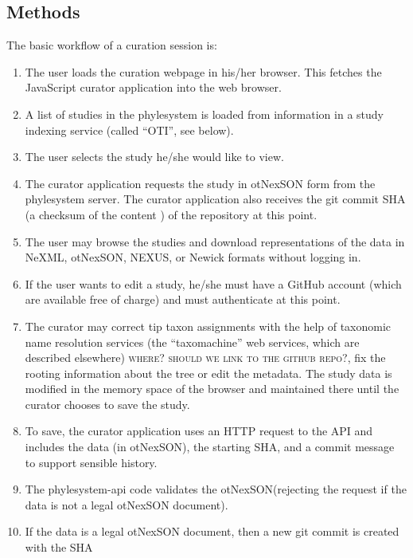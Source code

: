 \documentclass{bioinfo}
\newcommand{\ps}{phylesystem\xspace}
\newcommand{\nexson}{otNexSON\xspace}
\newcommand{\js}{JavaScript\xspace}
\newcommand{\ejmcomment}[1]{{\color{green} \textsc{#1}}\xspace}
\begin{document}
\begin{methods}
\section{Methods}
The basic workflow of a curation session is:
\begin{enumerate}
    \item \label{loadAppStep} The user loads the curation webpage in his/her browser.  This fetches the \js curator application into the web browser.
    \item \label{otiListStep} A list of studies in the \ps is loaded from information in a study indexing service (called ``OTI'', see below).
    \item The user selects the study he/she would like to view.
    \item \label{getStudyStep} The curator application requests the study in \nexson form from the \ps server.
        The curator application also receives the git commit SHA (a checksum of the content ) of the repository at this point.
    \item \label{browseStep} The user may browse the studies and download representations of the data in NeXML, \nexson, NEXUS\cite{NEXUS}, or Newick formats without logging in.
    \item \label{authStep} If the user wants to edit a study, he/she must have a GitHub account (which are available free of charge) and must authenticate at this point.
    \item \label{userEditStep} The curator may correct tip taxon assignments with the help of taxonomic name resolution services (the ``taxomachine'' web services, which are described
        elsewhere) \ejmcomment{where? should we link to the github repo?}, 
        fix the rooting information about the tree or edit the metadata. The study data is modified in the memory space of the 
        browser and maintained there until the curator chooses to save the study.
    \item \label{putStep} To save, the curator application uses an
      HTTP request to the API and includes the data (in \nexson), the starting SHA, and a commit message to support sensible history. 
    \item \label{validateStep} The \ps-api code validates the \nexson (rejecting the request if the data is not a legal \nexson document).
    \item \label{gitSaveStep} If the data is a legal \nexson document, then a new git commit is created with the SHA

\end{enumerate}
\end{methods}
\end{document}
